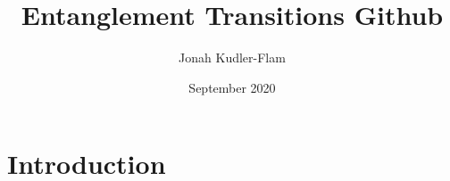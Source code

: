 \documentclass{article}
\title{Entanglement Transitions Github}
\author{Jonah Kudler-Flam}
\date{September 2020}
\begin{document}
\maketitle

\section{Introduction}
\end{document}
